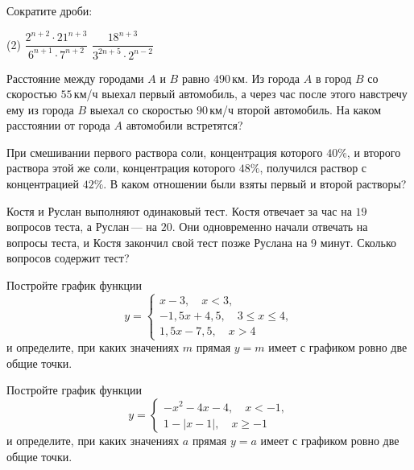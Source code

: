 \begin{consultation}
	\begin{listofex}
		\item Сократите дроби:
		\begin{tasks}(2)
			\task \( \dfrac{2^{n+2}\cdot21^{n+3}}{6^{n+1}\cdot7^{n+2}} \)
			\task \( \dfrac{18^{n+3}}{3^{2n+5}\cdot2^{n-2}} \)
		\end{tasks}
		\item Расстояние между городами \( A \) и \( B \) равно \( 490 \) км. Из города \( A \) в город \( B \) со скоростью \( 55 \) км/ч выехал первый автомобиль, а через час после этого навстречу ему из города \( B \) выехал со скоростью \( 90 \) км/ч второй автомобиль. На каком расстоянии от города \( A \) автомобили встретятся?
		\item При смешивании первого раствора соли, концентрация которого \( 40\% \), и второго раствора этой же соли, концентрация которого \( 48\% \), получился раствор с концентрацией \( 42\% \). В каком отношении были взяты первый и второй растворы?
		\item Костя и Руслан выполняют одинаковый тест. Костя отвечает за час на \( 19 \) вопросов теста, а Руслан --- на \( 20 \). Они одновременно начали отвечать на вопросы теста, и Костя закончил свой тест позже Руслана на 9 минут. Сколько вопросов содержит тест?
		\item Постройте график функции
		\[y=	 \left\{
		\begin{array}{l}
			x-3, \quad x<3,\\
			-1,5x+4,5, \quad 3\le x\le4,\\
			1,5x-7,5, \quad x>4
		\end{array}
		\right. \]
		и определите, при каких значениях \( m \) прямая \( y=m \) имеет с графиком ровно две общие точки.
		\item  Постройте график функции
		\[y=	 \left\{
		\begin{array}{l}
			-x^2-4x-4, \quad x<-1,\\
			1-|x-1|, \quad x\ge-1
		\end{array}
		\right. \]
		и определите, при каких значениях \( a \) прямая \( y=a \) имеет с графиком ровно две общие точки.
	\end{listofex}
\end{consultation}

